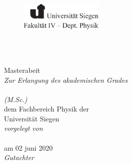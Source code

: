 \documentclass[
12pt, %
english, %
singlespacing, %
headsepline, %
]{MastersDoctoralThesis} %
\author{Agha Mohammad \textsc{Raza}} %
\begin{document}
\frontmatter %

\pagestyle{plain} %


\begin{titlepage}

\begin{figure}
\hfill\includegraphics[width=40mm]{./images/uni-logo-black.eps}
\end{figure}

\begin{center}

\HRule \\[0.4cm] %
{\huge \bfseries \ttitle\par}\vspace{0.4cm} %
\HRule \\[1.5cm] %

\large {Masterabeit}\\[0.5cm] %

\large \textit{Zur Erlangung des akademischen Grades\\ \degreename \\ (M.Sc.)}\\[0.3cm] %
\large {dem Fachbereich Physik der \\ Universität Siegen}\\[3cm] %

\emph{vorgelegt von}\\
{\authorname}\\ %
{\large am 02 juni 2020}\\[2cm] %
\emph{Gutachter} \\
{\supname} \\ %
{\examname} \\ %

\end{center}
\end{titlepage}
\end{document}
